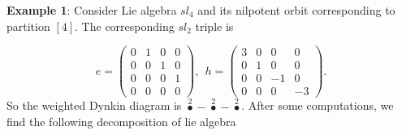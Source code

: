 \documentclass[a4paper,11pt]{article}
\begin{document}
\textbf{Example 1}: Consider Lie algebra $sl_4$ and its  nilpotent orbit corresponding to partition $[4]$. The  corresponding $sl_2$ triple is 

\begin{equation}
e=\left(\begin{array}{cccc}
0&1&0&0\\
0&0 &1&0\\
0&0&0&1 \\
0&0&0&0
\end{array}\right), ~~
h=\left(\begin{array}{cccc}
3&0&0&0\\
0&1 &0&0\\
0&0&-1&0 \\
0&0&0&-3
\end{array}\right).
\end{equation}
So the weighted Dynkin diagram is $\overset{2}{\bullet}-\overset{2}{\bullet}-\overset{2}{\bullet}$.
After some computations, we find the following decomposition of lie algebra
\end{document}
